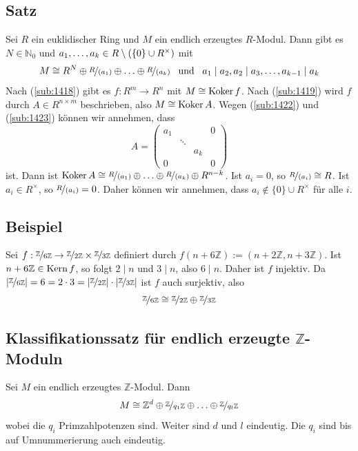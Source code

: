 \subsection[Satz: Konstruktion eines isomorphen Moduls mit $R^n$]{Satz} %
\label{sub:1425}
Sei $R$ ein euklidischer Ring und $M$ ein endlich erzeugtes $R$-Modul. Dann gibt es $N \in \mathds{N}_0$ und 
$a_1, \ldots , a_k \in R \setminus \enbrace*{ \{0\} \cup R^\times} $ mit
\[
	M \cong R^N \oplus \nicefrac{R}{(a_1)} \oplus \ldots \oplus \nicefrac{R}{(a_k)} \enspace \text{ und }\enspace a_1 \mid a_2, a_2 \mid a_3, \ldots , a_{k-1} \mid a_k
\]
Nach (\ref{sub:1418}) gibt es $f : R^m \to R^n$ mit $M \cong \koker f$. Nach (\ref{sub:1419}) wird $f$ durch $A \in R^{n \times m}$ beschrieben, also 
$M \cong \koker A$. Wegen (\ref{sub:1422}) und (\ref{sub:1423}) können wir annehmen, dass 
\[
	A= \begin{pmatrix}
		a_1 & & & 0 \\
		 & \ddots & & \\
		 & & a_k & \\
		 0 & & & 0
	\end{pmatrix}
\]
ist. Dann ist $\koker A \cong \nicefrac{R}{(a_1)} \oplus \ldots \oplus \nicefrac{R}{(a_k)} \oplus R^{n-k}$. Ist $a_i = 0$, so $\nicefrac{R}{(a_i)} \cong R$. Ist 
$a_i \in R^\times$, so $\nicefrac{R}{(a_i)} = 0$. Daher können wir annehmen, dass $a_i \not\in \{0\} \cup R^\times$ für alle $i$. \bewende

\subsection{Beispiel} %
\label{sub:1426}
Sei $f : \nicefrac{\mathds{Z}}{6 \mathds{Z}} \to \nicefrac{\mathds{Z}}{2 \mathds{Z}} \times \nicefrac{\mathds{Z}}{3 \mathds{Z}}$ definiert durch
$f(n + 6\mathds{Z}) := (n+2\mathds{Z}, n+3\mathds{Z})$. Ist $n+6\mathds{Z} \in \Kern f$, so folgt $2 \mid n$ und $3 \mid n$, also $6 \mid n$. Daher ist $f$ injektiv.
Da $\abs*{\nicefrac{\mathds{Z}}{6 \mathds{Z}}} = 6 = 2 \cdot 3 = \abs*{\nicefrac{\mathds{Z}}{2 \mathds{Z}}} \cdot \abs*{\nicefrac{\mathds{Z}}{3 \mathds{Z}}}$ ist $f$ auch
surjektiv, also 
\[
	\nicefrac{\mathds{Z}}{6 \mathds{Z}} \cong \nicefrac{\mathds{Z}}{2 \mathds{Z}} \oplus \nicefrac{\mathds{Z}}{3 \mathds{Z}}
\]


\subsection{Klassifikationssatz für endlich erzeugte $\mathds{Z}$-Moduln} %
\label{sub:1428}
Sei $M$ ein endlich erzeugtes $\mathds{Z}$-Modul. Dann 
\[
	M \cong \mathds{Z}^d \oplus \nicefrac{\mathds{Z}}{q_1 \mathds{Z}} \oplus \ldots \oplus \nicefrac{\mathds{Z}}{q_l \mathds{Z}}
\]
wobei die $q_i$ Primzahlpotenzen sind. Weiter sind $d$ und $l$ eindeutig. Die $q_i$ sind bis auf Umnummerierung auch eindeutig.
